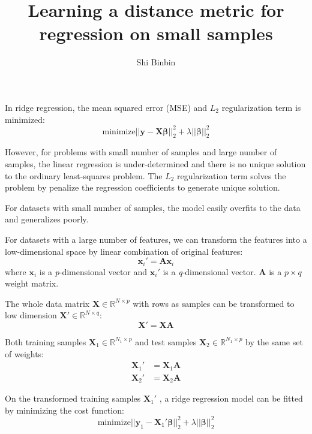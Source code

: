 \documentclass[a4paper,11pt]{article}
\title{Learning a distance metric for regression on small samples}
\author{Shi Binbin}
\begin{document}
\maketitle

In ridge regression,  the mean squared error (MSE) and $L_2$ regularization term is minimized:
\begin{equation}
\text{minimize} ||\mathbf{y} - \mathbf{X}\boldsymbol{\beta}||_2^2 + \lambda ||\boldsymbol{\beta}||_2^2
\end{equation}

However, for problems with small number of samples and large number of samples, 
the linear regression is under-determined and there is no unique solution to the ordinary least-squares problem.
The $L_2$ regularization term solves the problem by penalize the regression coefficients to generate unique solution.

For datasets with small number of samples, the model easily overfits to the data and generalizes poorly.

For datasets with a large number of features, we can transform the features into a low-dimensional space 
by linear combination of original features:
\begin{equation}
\mathbf{x}_i' = \mathbf{A}\mathbf{x}_i
\end{equation}
where $\mathbf{x}_i$ is a \textit{p}-dimensional vector and $\mathbf{x}_i'$ is a \textit{q}-dimensional vector.
$\mathbf{A}$ is a $p \times q$ weight matrix.

The whole data matrix $\mathbf{X} \in \mathbb{R}^{N \times p}$ with rows as samples can be transformed to low dimension $\mathbf{X}' \in \mathbb{R}^{N \times q} $:
\begin{equation}
\mathbf{X}' = \mathbf{X}\mathbf{A}
\end{equation}

Both training samples $\mathbf{X}_1 \in \mathbb{R}^{N_1 \times p}$ and test samples $\mathbf{X}_2 \in \mathbb{R}^{N_1 \times p}$ by the same set of weights:
\begin{align}
\mathbf{X}_1' & = \mathbf{X}_1 \mathbf{A} \\
\mathbf{X}_2' & = \mathbf{X}_2 \mathbf{A}
\end{align}

On the transformed training samples $\mathbf{X}_1'$ , a ridge regression model can be fitted by minimizing the cost function:
\begin{equation}
\text{minimize} ||\mathbf{y}_1 - \mathbf{X}_1'\boldsymbol{\beta}||_2^2 + \lambda ||\boldsymbol{\beta}||_2^2
\end{equation}
\end{document}
